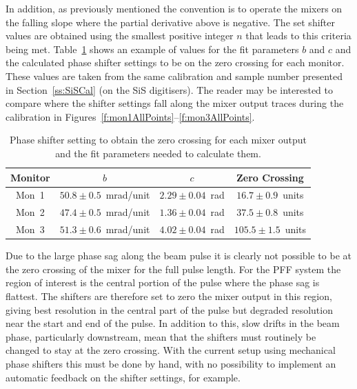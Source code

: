In addition, as previously mentioned the convention is to operate the mixers on the falling slope where the partial derivative above is negative. The set shifter values are obtained using the smallest positive integer \(n\) that leads to this criteria being met. Table~\ref{t:calZeroCross} shows an example of values for the fit parameters \(b\) and \(c\) and the calculated phase shifter settings to be on the zero crossing for each monitor. These values are taken from the same calibration and sample number presented in Section~\ref{ss:SiSCal} (on the SiS digitisers). The reader may be interested to compare where the shifter settings fall along the mixer output traces during the calibration in Figures~\ref{f:mon1AllPoints}--\ref{f:mon3AllPoints}.

\begin{table}
  \begin{center}
    \begin{tabular}{|c c c c|}
	   \hline
       Monitor & \(b\) & \(c\) & Zero Crossing \\ \hline
       Mon~1 & \(50.8\pm0.5\)~mrad/unit & \(2.29\pm0.04\)~rad & \(16.7\pm0.9\)~units \\ 
       Mon~2 & \(47.4\pm0.5\)~mrad/unit & \(1.36\pm0.04\)~rad & \(37.5\pm0.8\)~units \\
       Mon~3 & \(51.3\pm0.6\)~mrad/unit & \(4.02\pm0.04\)~rad & \(105.5\pm1.5\)~units \\ \hline
    \end{tabular}
    \caption{Phase shifter setting to obtain the zero crossing for each mixer output and the fit parameters needed to calculate them.}
  	\label{t:calZeroCross}
  \end{center}
\end{table}

Due to the large phase sag along the beam pulse it is clearly not possible to be at the zero crossing of the mixer for the full pulse length. For the PFF system the region of interest is the central portion of the pulse where the phase sag is flattest. The shifters are therefore set to zero the mixer output in this region, giving best resolution in the central part of the pulse but degraded resolution near the start and end of the pulse. In addition to this, slow drifts in the beam phase, particularly downstream, mean that the shifters must routinely be changed to stay at the zero crossing. With the current setup using mechanical phase shifters this must be done by hand, with no possibility to implement an automatic feedback on the shifter settings, for example.

